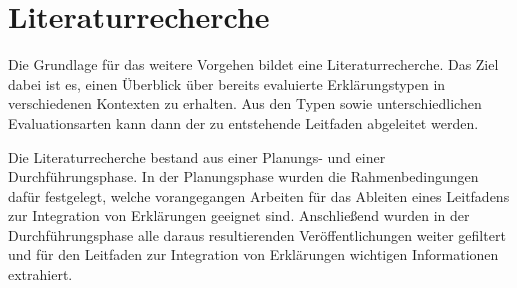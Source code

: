 \chapter{Literaturrecherche}
\label{sec:literature_review}

Die Grundlage für das weitere Vorgehen bildet eine Literaturrecherche. Das Ziel dabei ist es, einen Überblick über bereits evaluierte Erklärungstypen in verschiedenen Kontexten zu erhalten. Aus den Typen sowie unterschiedlichen Evaluationsarten kann dann der zu entstehende Leitfaden abgeleitet werden.

Die Literaturrecherche bestand aus einer Planungs- und einer Durchführungsphase. In der Planungsphase wurden die Rahmenbedingungen dafür festgelegt, welche vorangegangen Arbeiten für das Ableiten eines Leitfadens zur Integration von Erklärungen geeignet sind. Anschließend wurden in der Durchführungsphase alle daraus resultierenden Veröffentlichungen weiter gefiltert und für den Leitfaden zur Integration von Erklärungen wichtigen Informationen extrahiert.






